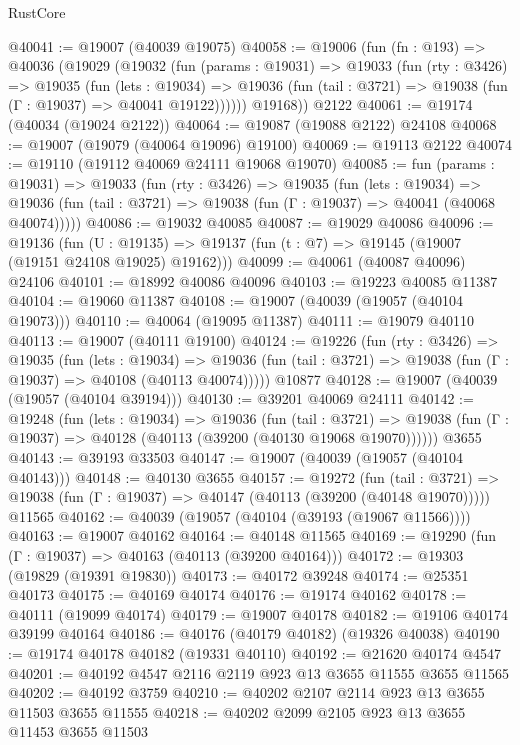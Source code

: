 \begin{lexlean}{RustCore}
\begin{coremodule}
@40041 := @19007 (@40039 @19075)
@40058 := @19006
    (fun (fn : @193) =>
    @40036
      (@19029
        (@19032
          (fun (params : @19031) =>
          @19033
            (fun (rty : @3426) =>
            @19035
              (fun (lets : @19034) =>
              @19036 (fun (tail : @3721) => @19038 (fun (Γ : @19037) => @40041 @19122))))))
        @19168))
    @2122
@40061 := @19174 (@40034 (@19024 @2122))
@40064 := @19087 (@19088 @2122) @24108
@40068 := @19007 (@19079 (@40064 @19096) @19100)
@40069 := @19113 @2122
@40074 := @19110 (@19112 @40069 @24111 @19068 @19070)
@40085 := fun (params : @19031) =>
  @19033
    (fun (rty : @3426) =>
    @19035
      (fun (lets : @19034) =>
      @19036 (fun (tail : @3721) => @19038 (fun (Γ : @19037) => @40041 (@40068 @40074)))))
@40086 := @19032 @40085
@40087 := @19029 @40086
@40096 := @19136
    (fun (U : @19135) => @19137 (fun (t : @7) => @19145 (@19007 (@19151 @24108 @19025) @19162)))
@40099 := @40061 (@40087 @40096) @24106
@40101 := @18992 @40086 @40096
@40103 := @19223 @40085 @11387
@40104 := @19060 @11387
@40108 := @19007 (@40039 (@19057 (@40104 @19073)))
@40110 := @40064 (@19095 @11387)
@40111 := @19079 @40110
@40113 := @19007 (@40111 @19100)
@40124 := @19226
    (fun (rty : @3426) =>
    @19035
      (fun (lets : @19034) =>
      @19036 (fun (tail : @3721) => @19038 (fun (Γ : @19037) => @40108 (@40113 @40074)))))
    @10877
@40128 := @19007 (@40039 (@19057 (@40104 @39194)))
@40130 := @39201 @40069 @24111
@40142 := @19248
    (fun (lets : @19034) =>
    @19036
      (fun (tail : @3721) =>
      @19038 (fun (Γ : @19037) => @40128 (@40113 (@39200 (@40130 @19068 @19070))))))
    @3655
@40143 := @39193 @33503
@40147 := @19007 (@40039 (@19057 (@40104 @40143)))
@40148 := @40130 @3655
@40157 := @19272
    (fun (tail : @3721) => @19038 (fun (Γ : @19037) => @40147 (@40113 (@39200 (@40148 @19070)))))
    @11565
@40162 := @40039 (@19057 (@40104 (@39193 (@19067 @11566))))
@40163 := @19007 @40162
@40164 := @40148 @11565
@40169 := @19290 (fun (Γ : @19037) => @40163 (@40113 (@39200 @40164)))
@40172 := @19303 (@19829 (@19391 @19830))
@40173 := @40172 @39248
@40174 := @25351 @40173
@40175 := @40169 @40174
@40176 := @19174 @40162
@40178 := @40111 (@19099 @40174)
@40179 := @19007 @40178
@40182 := @19106 @40174 @39199 @40164
@40186 := @40176 (@40179 @40182) (@19326 @40038)
@40190 := @19174 @40178 @40182 (@19331 @40110)
@40192 := @21620 @40174 @4547
@40201 := @40192 @4547 @2116 @2119 @923 @13 @3655 @11555 @3655 @11565
@40202 := @40192 @3759
@40210 := @40202 @2107 @2114 @923 @13 @3655 @11503 @3655 @11555
@40218 := @40202 @2099 @2105 @923 @13 @3655 @11453 @3655 @11503

\end{coremodule}
\end{lexlean}
